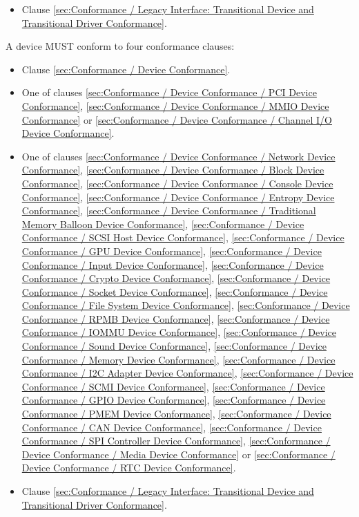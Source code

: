 \begin{description}
\begin{itemize}
    \item Clause \ref{sec:Conformance / Legacy Interface: Transitional Device and Transitional Driver Conformance}.
  \end{itemize}
\item[Device] A device MUST conform to four conformance clauses:
  \begin{itemize}
    \item Clause \ref{sec:Conformance / Device Conformance}.
    \item One of clauses \ref{sec:Conformance / Device Conformance / PCI Device Conformance}, \ref{sec:Conformance / Device Conformance / MMIO Device Conformance} or \ref{sec:Conformance / Device Conformance / Channel I/O Device Conformance}.
    \item One of clauses 
\ref{sec:Conformance / Device Conformance / Network Device Conformance}, 
\ref{sec:Conformance / Device Conformance / Block Device Conformance}, 
\ref{sec:Conformance / Device Conformance / Console Device Conformance}, 
\ref{sec:Conformance / Device Conformance / Entropy Device Conformance}, 
\ref{sec:Conformance / Device Conformance / Traditional Memory Balloon Device Conformance}, 
\ref{sec:Conformance / Device Conformance / SCSI Host Device Conformance}, 
\ref{sec:Conformance / Device Conformance / GPU Device Conformance},
\ref{sec:Conformance / Device Conformance / Input Device Conformance}, 
\ref{sec:Conformance / Device Conformance / Crypto Device Conformance}, 
\ref{sec:Conformance / Device Conformance / Socket Device Conformance}, 
\ref{sec:Conformance / Device Conformance / File System Device Conformance},
\ref{sec:Conformance / Device Conformance / RPMB Device Conformance},
\ref{sec:Conformance / Device Conformance / IOMMU Device Conformance},
\ref{sec:Conformance / Device Conformance / Sound Device Conformance},
\ref{sec:Conformance / Device Conformance / Memory Device Conformance},
\ref{sec:Conformance / Device Conformance / I2C Adapter Device Conformance},
\ref{sec:Conformance / Device Conformance / SCMI Device Conformance},
\ref{sec:Conformance / Device Conformance / GPIO Device Conformance},
\ref{sec:Conformance / Device Conformance / PMEM Device Conformance},
\ref{sec:Conformance / Device Conformance / CAN Device Conformance},
\ref{sec:Conformance / Device Conformance / SPI Controller Device Conformance},
\ref{sec:Conformance / Device Conformance / Media Device Conformance} or
\ref{sec:Conformance / Device Conformance / RTC Device Conformance}.

    \item Clause \ref{sec:Conformance / Legacy Interface: Transitional Device and Transitional Driver Conformance}.
  \end{itemize}
\end{description}


